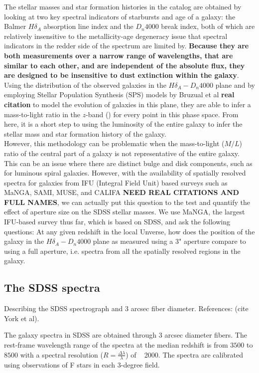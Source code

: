 The stellar masses and star formation histories in the catalog are obtained by looking at two key spectral indicators of starbursts and age of a galaxy: the Balmer $H\delta_{A}$ absorption line index and the $D_{n}4000$ break index, both of which are relatively insensitive to the metallicity-age degeneracy issue that spectral indicators in the redder side of the spectrum are limited by. {\bf Because they are both measurements over a narrow range of wavelengths, that are similar to each other, and are independent of the absolute flux, they are designed to be insensitive to dust extinction within the galaxy}. Using the distribution of the observed galaxies in the $H\delta_{A}-D_{n}4000$ plane and by employing Stellar Population Synthesis (SPS) models by Bruzual et al {\bf real citation} to model the evolution of galaxies in this plane, they are able to infer a mass-to-light ratio in the $z$-band (\citep{kauffmann_stellar_2003}) for every point in this phase space. From here, it is a short step to using the luminosity of the entire galaxy to infer the stellar mass and star formation history of the galaxy.\\
However, this methodology can be problematic when the mass-to-light ($M/L$) ratio of the central part of a galaxy is not representative of the entire galaxy. This can be an issue where there are distinct bulge and disk components, such as for luminous spiral galaxies. However, with the availability of spatially resolved spectra for galaxies from IFU (Integral Field Unit) based surveys such as MaNGA, SAMI, MUSE, and CALIFA {\bf NEED REAL CITATIONS AND FULL NAMES}, we can actually put this question to the test and quantify the effect of aperture size on the SDSS stellar masses. We use MaNGA, the largest IFU-based survey thus far, which is based on SDSS, and ask the following questions: At any given redshift in the local Unverse, how does the position of the galaxy in the $H\delta_{A}-D_{n}4000$ plane as measured using a $3$" aperture compare to using a full aperture, i.e. spectra from all the spatially resolved regions in the galaxy.\\ 


\subsection{The SDSS spectra}
Describing the SDSS spectrograph and $3$ arcsec fiber diameter. References: \citep{smee_multi-object_2013} (cite York et al).

The galaxy spectra in SDSS are obtained through $3$ arcsec diameter fibers. The rest-frame wavelength range of the spectra at the median redshift is from $3500$ to $8500$ with a spectral resolution ($R = \frac{\Delta\lambda}{\lambda}$) of ~ 2000. The spectra are calibrated using observations of F stars in each 3-degree field.


